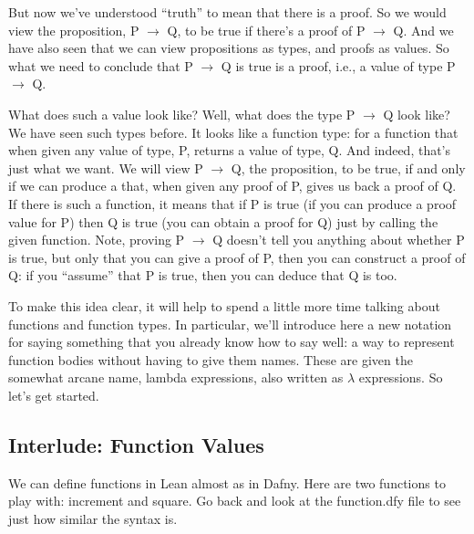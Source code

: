 \documentclass[letterpaper,10pt,english]{sphinxmanual}
\begin{document}
But now we’ve understood “truth” to mean that there is a proof. So we
would view the proposition, P \(\rightarrow\) Q, to be true if there’s a proof of P
\(\rightarrow\) Q. And we have also seen that we can view propositions as types, and
proofs as values. So what we need to conclude that P \(\rightarrow\) Q is true is a
proof, i.e., a value of type P \(\rightarrow\) Q.

What does such a value look like? Well, what does the type P \(\rightarrow\) Q look
like? We have seen such types before. It looks like a function type:
for a function that when given any value of type, P, returns a value
of type, Q. And indeed, that’s just what we want. We will view P \(\rightarrow\) Q,
the proposition, to be true, if and only if we can produce a
 that, when given any proof of P, gives us back a proof
of Q. If there is such a function, it means that if P is true (if you
can produce a proof value for P) then Q is true (you can obtain a
proof for Q) just by calling the given function. Note, proving P \(\rightarrow\) Q
doesn’t tell you anything about whether P is true, but only that 
you can give a proof of P, then you can construct a proof of Q: if you
“assume” that P is true, then you can deduce that Q is too.

To make this idea clear, it will help to spend a little more time
talking about functions and function types. In particular, we’ll
introduce here a new notation for saying something that you already
know how to say well: a way to represent function bodies without
having to give them names. These are given the somewhat arcane name,
lambda expressions, also written as \(\lambda\) expressions. So let’s get
started.


\subsection{Interlude: Function Values}
\label{\detokenize{15-proofs:interlude-function-values}}
We can define functions in Lean almost as in Dafny. Here are two
functions to play with: increment and square. Go back and look at the
function.dfy file to see just how similar the syntax is.

\begin{sphinxVerbatim}[commandchars=\\\{\}]
       
       
       
\end{sphinxVerbatim}
\end{document}
